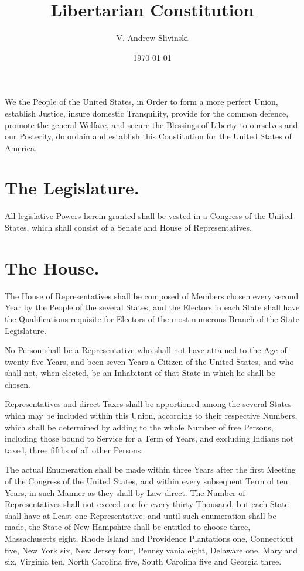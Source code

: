 \documentclass[12pt]{constitution}
\begin{document}
\title{Libertarian Constitution}
\author{V. Andrew Slivinski}
\date{\today}
\maketitle
\setcounter{tocdepth}{0}
\tableofcontents
\newpage

We the People of the United States, in Order to form a more perfect Union,
establish Justice, insure domestic Tranquility, provide for the common
defence, promote the general Welfare, and secure the Blessings of Liberty to
ourselves and our Posterity, do ordain and establish this Constitution for the
United States of America.




\section{The Legislature.}
All legislative Powers herein granted shall be vested in a Congress of the
United States, which shall consist of a Senate and House of Representatives.


\section{The House.}
The House of Representatives shall be composed of Members chosen every second
Year by the People of the several States, and the Electors in each State shall
have the Qualifications requisite for Electors of the most numerous Branch of
the State Legislature.

No Person shall be a Representative who shall not have attained to the Age of
twenty five Years, and been seven Years a Citizen of the United States, and who
shall not, when elected, be an Inhabitant of that State in which he shall be
chosen.

Representatives and direct Taxes shall be apportioned among the several States
which may be included within this Union, according to their respective Numbers,
which shall be determined by adding to the whole Number of free Persons,
including those bound to Service for a Term of Years, and excluding Indians not
taxed, three fifths of all other Persons.

The actual Enumeration shall be made within three Years after the first Meeting
of the Congress of the United States, and within every subsequent Term of ten
Years, in such Manner as they shall by Law direct. The Number of
Representatives shall not exceed one for every thirty Thousand, but each State
shall have at Least one Representative; and until such enumeration shall be
made, the State of New Hampshire shall be entitled to choose three,
Massachusetts eight, Rhode Island and Providence Plantations one, Connecticut
five, New York six, New Jersey four, Pennsylvania eight, Delaware one, Maryland
six, Virginia ten, North Carolina five, South Carolina five and Georgia three.
\end{document}
